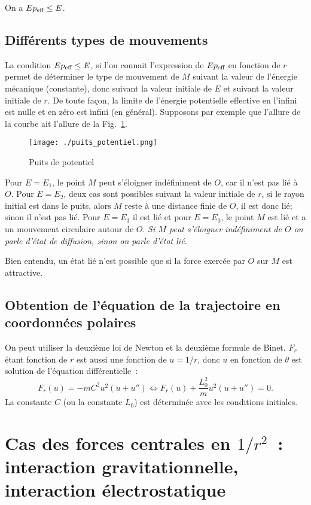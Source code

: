 On a \(Ep_{\textmd{eff}} \leq E\).

\subsection{Différents types de mouvements}%
La condition \(Ep_{\textmd{eff}} \leq E\), si l'on connait l'expression de 
\(Ep_{\textmd{eff}}\) en fonction de \(r\) permet de déterminer le type de 
mouvement de \(M\) suivant la valeur de l'énergie mécanique (constante), donc 
suivant la valeur initiale de \(E\) et suivant la valeur initiale de \(r\). De 
toute façon, la limite de l'énergie potentielle effective en l'infini est nulle 
et en zéro est infini (en général). Supposons par exemple que l'allure de la 
courbe ait l'allure de la Fig.~\ref{fig:puits_potentiel}.

\begin{figure}%
  \centering
  \texttt{[image: ./puits\_potentiel.png]}
  \caption{Puits de potentiel}\label{fig:puits_potentiel}
\end{figure}%

Pour \(E = E_1\), le point \(M\) peut s'éloigner indéfiniment de \(O\), car il 
n'est pas lié à \(O\). Pour \(E=E_2\), deux cas sont possibles suivant la 
valeur initiale de \(r\), si le rayon initial est dans le puits, alors \(M\) 
reste à une distance finie de \(O\), il est donc lié; sinon il n'est pas lié.
Pour \(E=E_3\) il est lié et pour \(E=E_0\), le point \(M\) est lié et a un
mouvement circulaire autour de \(O\). \emph{Si \(M\) peut s'éloigner 
indéfiniment de \(O\) on parle d'état de diffusion, sinon on parle d'état lié.}

Bien entendu, un état lié n'est possible que si la force exercée par \(O\) sur 
\(M\) est attractive.

\subsection{Obtention de l'équation de la trajectoire en coordonnées polaires}%
On peut utiliser la deuxième loi de Newton et la deuxième formule de Binet. 
\(F_r\) étant fonction de \(r\) est aussi une fonction de \(u = 1/r\), donc 
\(u\) en fonction de \(\theta\) est solution de l'équation différentielle~:
\begin{equation}%
  F_r(u) = -mC^2u^2(u+u'') \iff F_r(u) + \frac{L_0^2}{m}u^2(u+u'') = 0.
\end{equation}%
La constante \(C\) (ou la constante \(L_0\)) est déterminée avec les conditions 
initiales.
\section{Cas des forces centrales en \(1/r^2\)~: interaction gravitationnelle,
interaction électrostatique}
